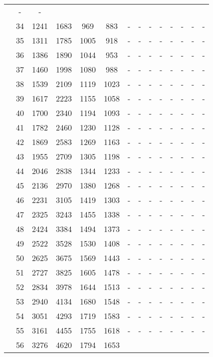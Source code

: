 \begin{table}[htb]
{\begin{tabular}{|c|c|c|c|c|c|c|c|c|c|c|c|c|c|}
 & - & -
 \\
 & 
34 & 1241 & 1683 & 969 & 883
 & - & -
 & - & -
 & - & -
 & - & -
 \\
 & 
35 & 1311 & 1785 & 1005 & 918
 & - & -
 & - & -
 & - & -
 & - & -
 \\
 & 
36 & 1386 & 1890 & 1044 & 953
 & - & -
 & - & -
 & - & -
 & - & -
 \\
 & 
37 & 1460 & 1998 & 1080 & 988
 & - & -
 & - & -
 & - & -
 & - & -
 \\
 & 
38 & 1539 & 2109 & 1119 & 1023
 & - & -
 & - & -
 & - & -
 & - & -
 \\
 & 
39 & 1617 & 2223 & 1155 & 1058
 & - & -
 & - & -
 & - & -
 & - & -
 \\
 & 
40 & 1700 & 2340 & 1194 & 1093
 & - & -
 & - & -
 & - & -
 & - & -
 \\
 & 
41 & 1782 & 2460 & 1230 & 1128
 & - & -
 & - & -
 & - & -
 & - & -
 \\
 & 
42 & 1869 & 2583 & 1269 & 1163
 & - & -
 & - & -
 & - & -
 & - & -
 \\
 & 
43 & 1955 & 2709 & 1305 & 1198
 & - & -
 & - & -
 & - & -
 & - & -
 \\
 & 
44 & 2046 & 2838 & 1344 & 1233
 & - & -
 & - & -
 & - & -
 & - & -
 \\
 & 
45 & 2136 & 2970 & 1380 & 1268
 & - & -
 & - & -
 & - & -
 & - & -
 \\
 & 
46 & 2231 & 3105 & 1419 & 1303
 & - & -
 & - & -
 & - & -
 & - & -
 \\
 & 
47 & 2325 & 3243 & 1455 & 1338
 & - & -
 & - & -
 & - & -
 & - & -
 \\
 & 
48 & 2424 & 3384 & 1494 & 1373
 & - & -
 & - & -
 & - & -
 & - & -
 \\
 & 
49 & 2522 & 3528 & 1530 & 1408
 & - & -
 & - & -
 & - & -
 & - & -
 \\
 & 
50 & 2625 & 3675 & 1569 & 1443
 & - & -
 & - & -
 & - & -
 & - & -
 \\
 & 
51 & 2727 & 3825 & 1605 & 1478
 & - & -
 & - & -
 & - & -
 & - & -
 \\
 & 
52 & 2834 & 3978 & 1644 & 1513
 & - & -
 & - & -
 & - & -
 & - & -
 \\
 & 
53 & 2940 & 4134 & 1680 & 1548
 & - & -
 & - & -
 & - & -
 & - & -
 \\
 & 
54 & 3051 & 4293 & 1719 & 1583
 & - & -
 & - & -
 & - & -
 & - & -
 \\
 & 
55 & 3161 & 4455 & 1755 & 1618
 & - & -
 & - & -
 & - & -
 & - & -
 \\
 & 
56 & 3276 & 4620 & 1794 & 1653

\end{tabular}}
\end{table}
